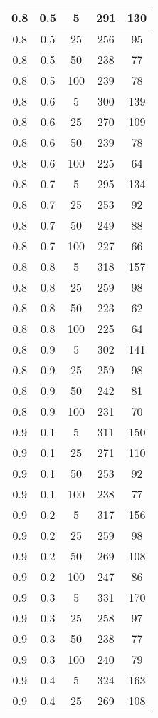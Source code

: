 \begin{appendices}
\begin{center}
\begin{longtable}[c]{|c|c|c|c|c|}
		\hline
		0.8& 0.5& 5& 291&  130\\
		\hline
		0.8& 0.5& 25& 256&  95\\
		\hline
		0.8& 0.5& 50& 238&  77\\
		\hline
		0.8& 0.5& 100& 239&  78\\
		\hline
		0.8& 0.6& 5& 300&  139\\
		\hline
		0.8& 0.6& 25& 270&  109\\
		\hline
		0.8& 0.6& 50& 239&  78\\
		\hline
		0.8& 0.6& 100& 225&  64\\
		\hline
		0.8& 0.7& 5& 295&  134\\
		\hline
		0.8& 0.7& 25& 253&  92\\
		\hline
		0.8& 0.7& 50& 249&  88\\
		\hline
		0.8& 0.7& 100& 227&  66\\
		\hline
		0.8& 0.8& 5& 318&  157\\
		\hline
		0.8& 0.8& 25& 259&  98\\
		\hline
		0.8& 0.8& 50& 223&  62\\
		\hline
		0.8& 0.8& 100& 225&  64\\
		\hline
		0.8& 0.9& 5& 302&  141\\
		\hline
		0.8& 0.9& 25& 259&  98\\
		\hline
		0.8& 0.9& 50& 242&  81\\
		\hline
		0.8& 0.9& 100& 231&  70\\
		\hline
		0.9& 0.1& 5& 311&  150\\
		\hline
		0.9& 0.1& 25& 271&  110\\
		\hline
		0.9& 0.1& 50& 253&  92\\
		\hline
		0.9& 0.1& 100& 238&  77\\
		\hline
		0.9& 0.2& 5& 317&  156\\
		\hline
		0.9& 0.2& 25& 259&  98\\
		\hline
		0.9& 0.2& 50& 269&  108\\
		\hline
		0.9& 0.2& 100& 247&  86\\
		\hline
		0.9& 0.3& 5& 331&  170\\
		\hline
		0.9& 0.3& 25& 258&  97\\
		\hline
		0.9& 0.3& 50& 238&  77\\
		\hline
		0.9& 0.3& 100& 240&  79\\
		\hline
		0.9& 0.4& 5& 324&  163\\
		\hline
		0.9& 0.4& 25& 269&  108\\
		\hline

\end{longtable}
\end{center}
\end{appendices}
